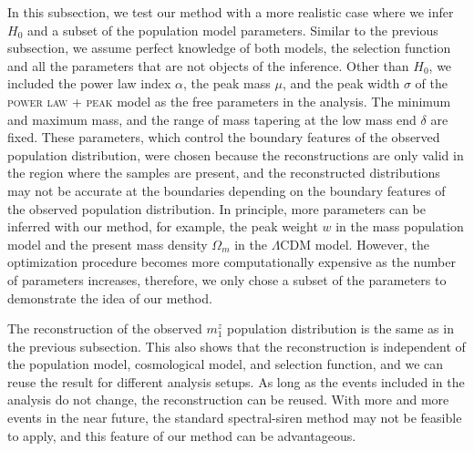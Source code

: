\documentclass[sn-aps, pdflatex]{sn-jnl}
\begin{document}
In this subsection, we test our method with a more realistic case where we infer $H_0$ and a subset of the population model parameters.
Similar to the previous subsection, we assume perfect knowledge of both models, the selection function and all the parameters that are not objects of the inference.
Other than $H_0$, we included the power law index $\alpha$, the peak mass $\mu$, and the peak width $\sigma$ of the \textsc{power law + peak} model as the free parameters in the analysis.
The minimum and maximum mass, and the range of mass tapering at the low mass end $\delta$ are fixed.
These parameters, which control the boundary features of the observed population distribution, were chosen because the reconstructions are only valid in the region where the samples are present, and the reconstructed distributions may not be accurate at the boundaries depending on the boundary features of the observed population distribution.
In principle, more parameters can be inferred with our method, for example, the peak weight $w$ in the mass population model and the present mass density $\Omega_m$ in the $\Lambda$CDM model.
However, the optimization procedure becomes more computationally expensive as the number of parameters increases, therefore, we only chose a subset of the parameters to demonstrate the idea of our method.

The reconstruction of the observed $m^z_1$ population distribution is the same as in the previous subsection.
This also shows that the reconstruction is independent of the population model, cosmological model, and selection function, and we can reuse the result for different analysis setups.
As long as the events included in the analysis do not change, the reconstruction can be reused.
With more and more events in the near future, the standard spectral-siren method may not be feasible to apply, and this feature of our method can be advantageous.
\end{document}
